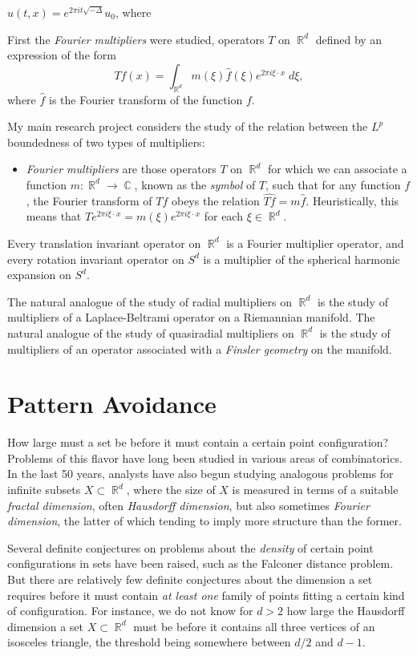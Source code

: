 \documentclass[12pt]{article}
\DeclareMathOperator{\RR}{\mathbb{R}}
\DeclareMathOperator{\CC}{\mathbb{C}}
\begin{document}
$u(t,x) = e^{2 \pi i t \sqrt{-\Delta}} u_0$, where

First the \emph{Fourier multipliers} were studied, operators $T$ on $\RR^d$ defined by an expression of the form
%
\[ Tf(x) = \int_{\RR^d} m(\xi) \widehat{f}(\xi) e^{2 \pi i \xi \cdot x}\; d\xi, \]
%
where $\widehat{f}$ is the Fourier transform of the function $f$.

My main research project considers the study of the relation between the $L^p$ boundedness of two types of multipliers:
%
\begin{itemize}
	\item \emph{Fourier multipliers} are those operators $T$ on $\RR^d$ for which we can associate a function $m: \RR^d \to \CC$, known as the \emph{symbol} of $T$, such that for any function $f$, the Fourier transform of $Tf$ obeys the relation $\widehat{Tf} = m \widehat{f}$. Heuristically, this means that $T e^{2 \pi i \xi \cdot x} = m(\xi) e^{2 \pi i \xi \cdot x}$ for each $\xi \in \RR^d$.
\end{itemize}

  Every translation invariant operator on $\RR^d$ is a Fourier multiplier operator, and every rotation invariant operator on $S^d$ is a multiplier of the spherical harmonic expansion on $S^d$.



The natural analogue of the study of radial multipliers on $\RR^d$ is the study of multipliers of a Laplace-Beltrami operator on a Riemannian manifold. The natural analogue of the study of quasiradial multipliers on $\RR^d$ is the study of multipliers of an operator associated with a \emph{Finsler geometry} on the manifold.

\section*{Pattern Avoidance}

How large must a set be before it must contain a certain point configuration? Problems of this flavor have long been studied in various areas of combinatorics. In the last 50 years, analysts have also begun studying analogous problems for infinite subsets $X \subset \RR^d$, where the size of $X$ is measured in terms of a suitable \emph{fractal dimension}, often \emph{Hausdorff dimension}, but also sometimes \emph{Fourier dimension}, the latter of which tending to imply more structure than the former.

Several definite conjectures on problems about the \emph{density} of certain point configurations in sets have been raised, such as the Falconer distance problem. %
But there are relatively few definite conjectures about the dimension a set requires before it must contain \emph{at least one} family of points fitting a certain kind of configuration. For instance, we do not know for $d > 2$ how large the Hausdorff dimension a set $X \subset \RR^d$ must be before it contains all three vertices of an isosceles triangle, the threshold being somewhere between $d/2$ and $d-1$.
\end{document}
